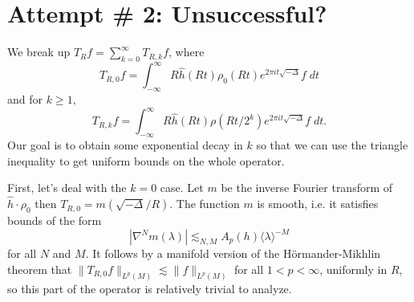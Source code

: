 \section{Attempt \# 2: Unsuccessful?}

We break up $T_R f = \sum_{k = 0}^\infty T_{R,k} f$, where
%
\[ T_{R,0} f = \int_{-\infty}^\infty R \widehat{h}(Rt) \rho_0(Rt) e^{2 \pi i t \sqrt{-\Delta}} f\; dt \]
%
and for $k \geq 1$,
%
\[ T_{R,k} f = \int_{-\infty}^\infty R \widehat{h}(Rt) \rho(Rt / 2^k) e^{2 \pi i t \sqrt{-\Delta}} f\; dt. \]
%
Our goal is to obtain some exponential decay in $k$ so that we can use the triangle inequality to get uniform bounds on the whole operator.

First, let's deal with the $k = 0$ case. Let $m$ be the inverse Fourier transform of $\widehat{h} \cdot \rho_0$ then $T_{R,0} = m \left( \sqrt{-\Delta} / R \right)$. The function $m$ is smooth, i.e. it satisfies bounds of the form
%
\[ |\nabla^N m(\lambda)| \lesssim_{N,M} A_p(h) \langle \lambda \rangle^{-M} \]
%
for all $N$ and $M$. It follows by a manifold version of the H\"{o}rmander-Mikhlin theorem \cite{SeegerSogge} that $\| T_{R,0} f \|_{L^p(M)} \lesssim \| f \|_{L^p(M)}$ for all $1 < p < \infty$, uniformly in $R$, so this part of the operator is relatively trivial to analyze.

